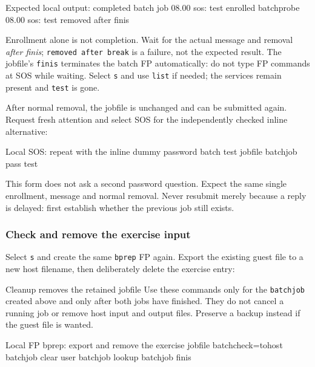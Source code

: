 \begin{commandexample}{Expected local output: completed batch job}
08.00 sos: test enrolled
 batchprobe
08.00 sos: test removed after finis
\end{commandexample}

Enrollment alone is not completion. Wait for the actual message and removal
\emph{after finis}; \texttt{removed after break} is a failure, not the expected
result. The jobfile's \texttt{finis} terminates the batch FP automatically:
do not type FP commands at SOS while waiting. Select \texttt{s} and use
\texttt{list} if needed; the services remain present and \texttt{test} is gone.

After normal removal, the jobfile is unchanged and can be submitted again.
Request fresh attention and select SOS for the independently checked inline
alternative:

\begin{commandexample}{Local SOS: repeat with the inline dummy password}
batch test jobfile batchjob pass test
\end{commandexample}

This form does not ask a second password question. Expect the same single
enrollment, message and normal removal. Never resubmit merely because a reply
is delayed: first establish whether the previous job still exists.

\subsubsection{Check and remove the exercise input}\label{mips-ts-batch-cleanup}

Select \texttt{s} and create the same \texttt{bprep} FP again. Export the
existing guest file to a new host filename, then deliberately delete the
exercise entry:

\begin{operationnote}{Cleanup removes the retained jobfile}
Use these commands only for the \texttt{batchjob} created above and only after
both jobs have finished. They do not cancel a running job or remove host input
and output files. Preserve a backup instead if the guest file is wanted.
\end{operationnote}

\begin{commandexample}{Local FP bprep: export and remove the exercise jobfile}
batchcheck=tohost batchjob
clear user batchjob
lookup batchjob
finis
\end{commandexample}

